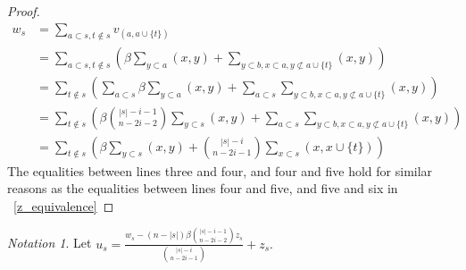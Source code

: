 \documentclass[10 pt]{amsart}
\theoremstyle{plain}
\theoremstyle{definition}
\theoremstyle{remark}
\newtheorem{note}[thm]{Notation}
\numberwithin{equation}{section}
\begin{document}
\begin{proof}
\begin{align*}
  w_s &= \sum_{a \subset s,t\notin s}^{}v_{(a, a \cup \{t\})}\\
  &= \sum_{a \subset s,t\notin s}^{}\left(\beta \sum_{y \subset a}^{}(x, y) + \sum_{y\subset b,x \subset a,y\not\subset a \cup \{t\}}^{}(x, y) \right)\\
  &= \sum_{t\notin s}^{}\left(\sum_{a \subset s}^{}\beta \sum_{y \subset a}^{}(x, y) + \sum_{a \subset s}^{}\sum_{y\subset b,x \subset a,y\not\subset a \cup \{t\}}^{}(x, y) \right)\\
  &=\sum_{t\notin s}^{}\left(\beta \binom {|s|-i-1}{n-2i-2}\sum_{y \subset s}^{}(x, y) + \sum_{a \subset s}^{}\sum_{y\subset b,x \subset a,y\not\subset a \cup \{t\}}^{}(x, y) \right)\\
  &=\sum_{t\notin s}^{} \left(\beta \sum_{y \subset s}^{}(x, y) + \binom {|s|-i}{n-2i-1}\sum_{x \subset s}^{}(x, x \cup \{t\}) \right)
\end{align*}
The equalities between lines three and four, and four and five hold for similar reasons as the equalities between lines four and five, and five and six in ~\ref{z_equivalence}
\end{proof}

\begin{note}
Let $u_s = \frac{w_s - (n - |s|)\beta \binom {|s|-i-1}{n-2i-2} z_s}{\binom {|s|-i}{n-2i-1}} + z_s.$
\end{note}
\end{document}
